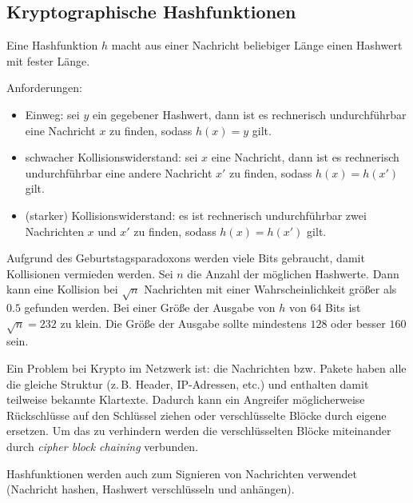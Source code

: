 \subsection{Kryptographische Hashfunktionen}%
\label{sub:kryptographische_hashfunktionen}

Eine Hashfunktion $h$ macht aus einer Nachricht beliebiger Länge einen Hashwert mit fester
Länge.

Anforderungen:
\begin{itemize}
  \item Einweg: sei $y$ ein gegebener Hashwert, dann ist es rechnerisch undurchführbar
    eine Nachricht $x$ zu finden, sodass $h(x) = y$ gilt.
  \item schwacher Kollisionswiderstand: sei $x$ eine Nachricht, dann ist es rechnerisch
    undurchführbar eine andere Nachricht $x'$ zu finden, sodass $h(x) = h(x')$ gilt.
  \item (starker) Kollisionswiderstand: es ist rechnerisch undurchführbar zwei Nachrichten
    $x$ und $x'$ zu finden, sodass $h(x) = h(x')$ gilt.
\end{itemize}

Aufgrund des Geburtstagsparadoxons werden viele Bits gebraucht, damit Kollisionen
vermieden werden.
Sei $n$ die Anzahl der möglichen Hashwerte.
Dann kann eine Kollision bei $\sqrt{n}$ Nachrichten mit einer Wahrscheinlichkeit größer
als $0.5$ gefunden werden.
Bei einer Größe der Ausgabe von $h$ von $64$ Bits ist $\sqrt{n} = 232$ zu klein.
Die Größe der Ausgabe sollte mindestens $128$ oder besser $160$ sein.

Ein Problem bei Krypto im Netzwerk ist: die Nachrichten bzw. Pakete haben alle die gleiche
Struktur (z.\,B. Header, IP-Adressen, etc.) und enthalten damit teilweise bekannte
Klartexte.
Dadurch kann ein Angreifer möglicherweise Rückschlüsse auf den Schlüssel ziehen oder
verschlüsselte Blöcke durch eigene ersetzen.
Um das zu verhindern werden die verschlüsselten Blöcke miteinander durch \emph{cipher
block chaining} verbunden.

Hashfunktionen werden auch zum Signieren von Nachrichten verwendet (Nachricht hashen,
Hashwert verschlüsseln und anhängen).

